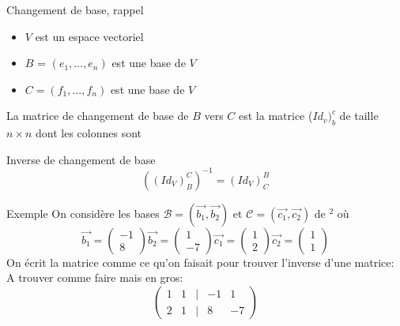 \begin{parag}{Changement de base, rappel}
    \begin{itemize}
        \item $V$ est un espace vectoriel
        \item $B$  = $(e_1, \dots, e_n)$ est une base de $V$
        \item $C = (f_1, \dots, f_n)$ est une base de $V$
    \end{itemize}

\begin{definition}
    La matrice de changement de base de $B$ vers $C$ est la matrice ($Id_v)_b^c$ de taille $n \times n$ dont les colonnes sont 
\end{definition}
\begin{subparag}{Inverse de changement de base}
   \[ \left((Id_V)_B^C\right)^{-1} = (Id_V)_C^B \]
\end{subparag}
\begin{subparag}{Exemple}
    On considère les bases $\mathcal{B} = (\vec{b_1}, \vec{b_2})$ et $\mathcal{C} = ( \vec{c_1}, \vec{c_2})$ de \R$^2$ où
    \[\vec{b_1} = \begin{pmatrix}
        -1 \\ 8
    \end{pmatrix} \vec{b_2} = \begin{pmatrix}
        1 \\-7
    \end{pmatrix} \vec{c_1} = \begin{pmatrix}
        1 \\ 2
    \end{pmatrix} \vec{c_2} = \begin{pmatrix}
        1 \\ 1
    \end{pmatrix}\]
    On écrit la matrice comme ce qu'on faisait pour trouver l'inverse d'une matrice: 
    A trouver comme faire mais en gros:
\[\begin{pmatrix}
    1 & 1 & | & -1 & 1 \\
    2 & 1 & | & 8 & -7
\end{pmatrix}\]
\end{subparag}
\end{parag}

